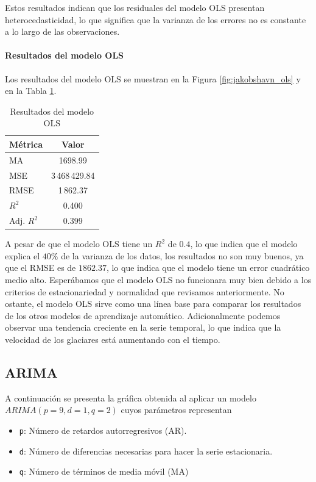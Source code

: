 \documentclass[sigconf,authordraft,language=spanish]{acmart}
\begin{document}
Estos resultados indican que los residuales del modelo OLS presentan heterocedasticidad, lo que significa que la varianza de los errores no es constante a lo largo de las observaciones.

\paragraph{Resultados del modelo OLS}

Los resultados del modelo OLS se muestran en la Figura \ref{fig:jakobshavn_ols} y en la Tabla \ref{tab:ols}.

\begin{table}[H]
  \caption{Resultados del modelo OLS}
  \label{tab:ols}
  \begin{tabular}{lc}
    \toprule
    Métrica & Valor \\
    \midrule
    MA & 1698.99 \\
    MSE & 3\,468\,429.84 \\
    RMSE & 1\,862.37 \\
    $R^2$ & 0.400 \\
    Adj. $R^2$ & 0.399 \\
    \bottomrule
  \end{tabular}
\end{table}

A pesar de que el modelo OLS tiene un $R^2$ de $0.4$, lo que indica que el modelo explica el $40\%$ de la varianza de los datos,
los resultados no son muy buenos, ya que el RMSE es de $1862.37$, lo que indica que el modelo tiene un error cuadrático medio alto.
Esperábamos que el modelo OLS no funcionara muy bien debido a los criterios de estacionariedad y normalidad que revisamos anteriormente.
No ostante, el modelo OLS sirve como una línea base para comparar los resultados de los otros modelos de aprendizaje automático.
Adicionalmente podemos observar una tendencia creciente en la serie temporal, lo que indica que la velocidad de los glaciares está aumentando con el tiempo.

\subsection{ARIMA}

A continuación se presenta la gráfica obtenida al aplicar un modelo $ARIMA(p=9,d=1,q=2)$ cuyos parámetros representan
\begin{itemize}
  \item \verb|p|: Número de retardos autorregresivos (AR).
  \item \verb|d|: Número de diferencias necesarias para hacer la serie estacionaria.
  \item \verb|q|: Número de términos de media móvil (MA)
\end{itemize}
\end{document}

